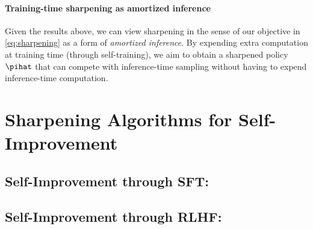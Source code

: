     
            
    

    \paragraph{Training-time sharpening as amortized inference}

    Given the results above, we can view sharpening in the sense
    of our objective in \cref{eq:sharpening} as a form of
    \emph{amortized inference}. By expending extra
    computation at training time (through self-training), we aim to obtain a sharpened policy
    $\pihat$ that can compete with inference-time \BestofN sampling
    without having to expend inference-time computation.


    

\begin{remark}

\end{remark}


  


\section{Sharpening Algorithms for Self-Improvement}
\label{sec:algorithms}


\subsection{Self-Improvement through SFT: \bestofnalg}

\subsection{Self-Improvement through RLHF: \rlhfalg}


  
